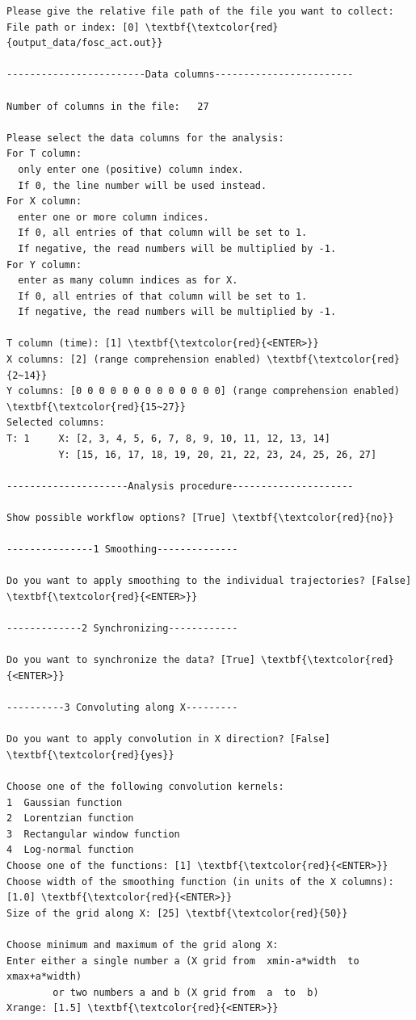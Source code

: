 \documentclass[a4paper,11pt,DIV=15,openany]{scrbook}
\begin{document}
\begin{oframed}
\begin{Verbatim}[commandchars=\\\{\}]
Please give the relative file path of the file you want to collect:
File path or index: [0] \textbf{\textcolor{red}{output_data/fosc_act.out}}

------------------------Data columns------------------------

Number of columns in the file:   27

Please select the data columns for the analysis:
For T column: 
  only enter one (positive) column index. 
  If 0, the line number will be used instead.
For X column: 
  enter one or more column indices. 
  If 0, all entries of that column will be set to 1. 
  If negative, the read numbers will be multiplied by -1.
For Y column: 
  enter as many column indices as for X. 
  If 0, all entries of that column will be set to 1. 
  If negative, the read numbers will be multiplied by -1.

T column (time): [1] \textbf{\textcolor{red}{<ENTER>}}
X columns: [2] (range comprehension enabled) \textbf{\textcolor{red}{2~14}}
Y columns: [0 0 0 0 0 0 0 0 0 0 0 0 0] (range comprehension enabled) \textbf{\textcolor{red}{15~27}}
Selected columns:
T: 1     X: [2, 3, 4, 5, 6, 7, 8, 9, 10, 11, 12, 13, 14]    
         Y: [15, 16, 17, 18, 19, 20, 21, 22, 23, 24, 25, 26, 27]

---------------------Analysis procedure---------------------

Show possible workflow options? [True] \textbf{\textcolor{red}{no}}

---------------1 Smoothing--------------

Do you want to apply smoothing to the individual trajectories? [False] \textbf{\textcolor{red}{<ENTER>}}

-------------2 Synchronizing------------

Do you want to synchronize the data? [True] \textbf{\textcolor{red}{<ENTER>}}

----------3 Convoluting along X---------

Do you want to apply convolution in X direction? [False] \textbf{\textcolor{red}{yes}}

Choose one of the following convolution kernels:
1  Gaussian function
2  Lorentzian function
3  Rectangular window function
4  Log-normal function
Choose one of the functions: [1] \textbf{\textcolor{red}{<ENTER>}}
Choose width of the smoothing function (in units of the X columns): [1.0] \textbf{\textcolor{red}{<ENTER>}}
Size of the grid along X: [25] \textbf{\textcolor{red}{50}}

Choose minimum and maximum of the grid along X:
Enter either a single number a (X grid from  xmin-a*width  to  xmax+a*width)
        or two numbers a and b (X grid from  a  to  b)
Xrange: [1.5] \textbf{\textcolor{red}{<ENTER>}}


\end{Verbatim}
\end{oframed}
\end{document}

